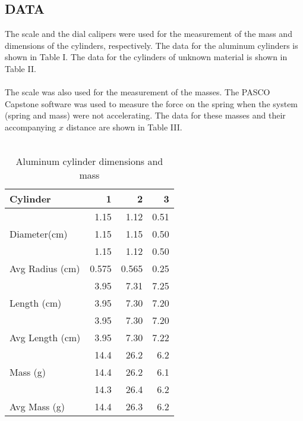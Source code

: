 \documentclass [12pt, letterpaper, twoside] {article}
\begin{document}
\subsection* {DATA}
The scale and the dial calipers were used for the measurement of the mass and dimensions of the cylinders, respectively. The data for the aluminum cylinders is shown in Table I. The data for the cylinders of unknown material is shown in Table II.\\\\
The scale was also used for the measurement of the masses. The PASCO Capstone software was used to measure the force on the spring when the system (spring and mass) were not accelerating. The data for these masses and their accompanying \(x\) distance are shown in Table III.\\\\

\begin {table}[H]
  \centering
  \begin {tabular}{|l | r | r | r|}
    \hline\hline
    Cylinder & 1 & 2 & 3 \\
    \hline
    \multirow {3}{*}{Diameter(cm)} & 1.15 & 1.12 & 0.51 \\
    & 1.15 & 1.15 & 0.50 \\
    & 1.15 & 1.12 & 0.50 \\
    \hline
    Avg Radius (cm) & 0.575 & 0.565 & 0.25 \\
    \hline
    \multirow {3}{*}{Length (cm)} & 3.95 & 7.31 & 7.25 \\
    & 3.95 & 7.30 & 7.20 \\
    & 3.95 & 7.30 & 7.20 \\
    \hline
    Avg Length (cm) & 3.95 & 7.30 & 7.22 \\
    \hline
    \multirow {3}{*}{Mass (g)} & 14.4 & 26.2 & 6.2 \\
    & 14.4 & 26.2 & 6.1 \\
    & 14.3 & 26.4 & 6.2 \\
    \hline
    Avg Mass (g) & 14.4 & 26.3 & 6.2 \\
    \hline\hline
  \end {tabular} \\
  \caption {Aluminum cylinder dimensions and mass}
\end {table}
\end{document}
